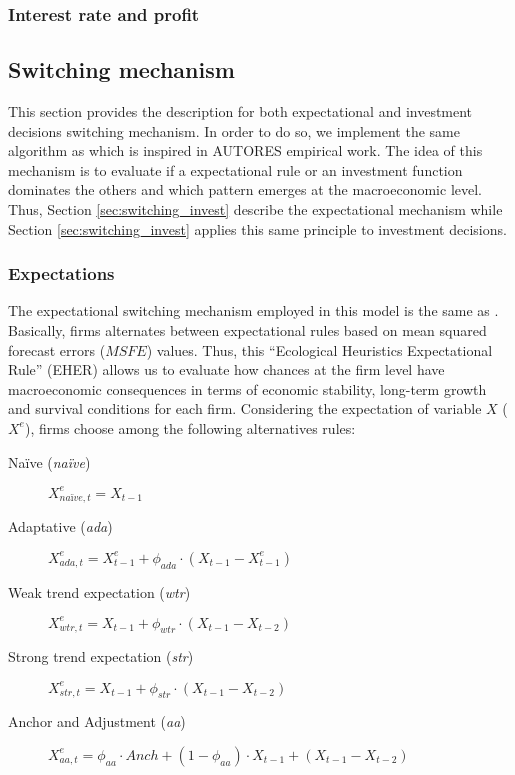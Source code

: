\documentclass[12pt,openright,oneside,a4paper,english,sumario=tradicional]{gpsabntex}
\numberwithin{listing}{chapter}
\begin{document}
\subsubsection{Interest rate and profit}
\label{sec:org57f4711}

\subsection{Switching mechanism}
\label{sec:switching}
This section provides the description for both expectational and investment decisions switching mechanism.
In order to do so, we implement the same algorithm as \textcite{dosi_2020_RATIONAL,reissl_2021_Heterogeneousa} which is inspired in AUTORES empirical work.
The idea of this mechanism is to evaluate if a expectational rule or an investment function dominates the others and which pattern emerges at the macroeconomic level.
Thus, Section \ref{sec:switching_invest} describe the expectational mechanism while Section \ref{sec:switching_invest} applies this same principle to investment decisions.

\subsubsection{Expectations}
\label{sec:switching_expec}
The expectational switching mechanism employed in this model is the same as \textcite{dosi_2020_RATIONAL,reissl_2021_Heterogeneousa}.
Basically, firms alternates between expectational rules based on mean squared forecast errors (\(MSFE\)) values.
Thus, this ``Ecological Heuristics Expectational Rule'' (EHER) allows us to evaluate how chances at the firm level have macroeconomic consequences in terms of economic stability, long-term growth and survival conditions for each firm.
Considering the expectation of variable \(X\) (\(X^{e}\)), firms choose among the following alternatives rules:

\begin{description}
\item[{Naïve (\emph{naïve})}] \(X^{e}_{na\text{\"{i}}ve,t} = X_{t-1}\)
\item[{Adaptative (\emph{ada})}] \(X^{e}_{ada,t} = X^{e}_{t-1} + \phi_{ada}\cdot (X_{t-1} - X^{e}_{t-1})\)
\item[{Weak trend expectation (\emph{wtr})}] \(X^{e}_{wtr,t} = X_{t-1} + \phi_{wtr}\cdot (X_{t-1} - X_{t-2})\)
\item[{Strong trend expectation (\emph{str})}] \(X^{e}_{str,t} = X_{t-1} + \phi_{str}\cdot (X_{t-1} - X_{t-2})\)
\item[{Anchor and Adjustment (\emph{aa})}] \(X^{e}_{aa,t} = \phi_{aa}\cdot Anch + (1-\phi_{aa})\cdot X_{t-1} + (X_{t-1} - X_{t-2})\)
\end{description}
\end{document}
